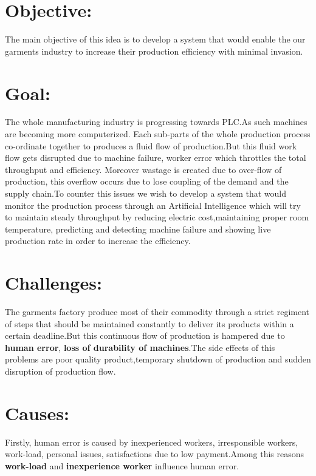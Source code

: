\documentclass{article}
\begin{document}
    \begin{normalsize}
    
    	\section{Objective:}
        
        The main objective of this idea is to develop a system that would enable the our garments industry to increase their production efficiency with minimal invasion. 
           \section{Goal:}
        The whole manufacturing industry is progressing towards PLC.As such machines are becoming more computerized. Each sub-parts of the whole production process co-ordinate together to produces a fluid flow of production.But this fluid work flow gets disrupted due to machine failure, worker error which throttles the total throughput and efficiency. Moreover wastage is created due to over-flow of production, this overflow occurs due to lose coupling of the demand and the supply chain.To counter this issues we wish to develop a system that would monitor the production process through an Artificial Intelligence which will try to maintain steady throughput by reducing electric cost,maintaining proper room temperature, predicting and detecting machine failure and showing live production rate in order to increase the efficiency.
  
      
		\section{Challenges:}
        
       The garments factory produce most of their commodity through a strict regiment of steps that should be maintained constantly to deliver its products within a certain deadline.But this continuous flow of production is hampered due to \textbf{ human error}, \textbf{ loss of durability of machines}.The side effects of this problems are poor quality product,temporary shutdown of production and sudden disruption of production flow.   
        
	   	\section{Causes:}
        
      Firstly, human error is caused by inexperienced workers, irresponsible workers, work-load, personal issues, satisfactions due to low payment.Among this reasons \textbf{work-load} and \textbf{inexperience worker} influence human error.
      

\end{normalsize}
\end{document}
